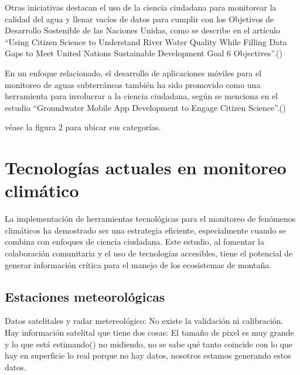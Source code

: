 Otras iniciativas destacan el uso de la ciencia ciudadana para monitorear la calidad del agua y llenar vacíos de datos para cumplir con los Objetivos de Desarrollo Sostenible de las Naciones Unidas, como se describe en el artículo “Using Citizen Science to Understand River Water Quality While Filling Data Gaps to Meet United Nations Sustainable Development Goal 6 Objectives”.(\cite{mcginn2021using})

En un enfoque relacionado, el desarrollo de aplicaciones móviles para el monitoreo de aguas subterráneas también ha sido promovido como una herramienta para involucrar a la ciencia ciudadana, según se menciona en el estudio “Groundwater Mobile App Development to Engage Citizen Science”.(\cite{dennis2019groundwater})



véase la figura 2 para ubicar sus categorías.















\newpage
\section{Tecnologías actuales en monitoreo climático}
La implementación de herramientas tecnológicas para el monitoreo de fenómenos climáticos ha demostrado ser una estrategia eficiente, especialmente cuando se combina con enfoques de ciencia ciudadana. Este estudio, al fomentar la colaboración comunitaria y el uso de tecnologías accesibles, tiene el potencial de generar información crítica para el manejo de los ecosistemas de montaña.




\subsection{Estaciones meteorológicas}

Datos satelitales y radar metereológico: No existe la validación ni calibración. Hay información satelital que tiene dos cosas: El tamaño de pixel es muy grande y lo que está estimando() no midiendo, no se sabe qué tanto coincide con lo que hay en superficie lo real porque no hay datos, nosotros estamos generando estos datos.

